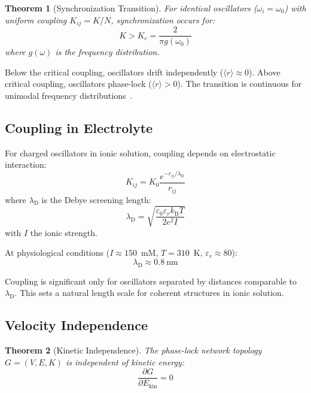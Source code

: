 \documentclass[twocolumn,aps,prb,superscriptaddress,longbibliography,floatfix]{revtex4-2}
\newtheorem{theorem}{Theorem}[section]
\theoremstyle{remark}
\newcommand{\kB}{k_\text{B}}
\newcommand{\orderpar}{\langle r \rangle}
\newcommand{\lambdaD}{\lambda_\text{D}}
\begin{document}
\begin{theorem}[Synchronization Transition]
\label{thm:sync}
For identical oscillators ($\omega_i = \omega_0$) with uniform coupling
$K_{ij} = K/N$, synchronization occurs for:
\begin{equation}
K > K_c = \frac{2}{\pi g(\omega_0)}
\end{equation}
where $g(\omega)$ is the frequency distribution.
\end{theorem}

Below the critical coupling, oscillators drift independently
($\orderpar \approx 0$). Above critical coupling, oscillators phase-lock
($\orderpar > 0$). The transition is continuous for unimodal frequency
distributions~\cite{Strogatz2000}.

\subsection{Coupling in Electrolyte}

For charged oscillators in ionic solution, coupling depends on
electrostatic interaction:
\begin{equation}
K_{ij} = K_0 \frac{e^{-r_{ij}/\lambdaD}}{r_{ij}}
\label{eq:debye_coupling}
\end{equation}
where $\lambdaD$ is the Debye screening length:
\begin{equation}
\lambdaD = \sqrt{\frac{\varepsilon_0 \varepsilon_r \kB T}{2 e^2 I}}
\label{eq:debye}
\end{equation}
with $I$ the ionic strength.

At physiological conditions ($I \approx 150$~mM, $T = 310$~K,
$\varepsilon_r \approx 80$):
\begin{equation}
\lambdaD \approx 0.8~\text{nm}
\end{equation}

Coupling is significant only for oscillators separated by distances
comparable to $\lambdaD$. This sets a natural length scale for coherent
structures in ionic solution.

\subsection{Velocity Independence}

\begin{theorem}[Kinetic Independence]
\label{thm:kinetic}
The phase-lock network topology $G = (V, E, K)$ is independent of
kinetic energy:
\begin{equation}
\frac{\partial G}{\partial E_\text{kin}} = 0
\label{eq:kinetic_indep}
\end{equation}
\end{theorem}
\end{document}
